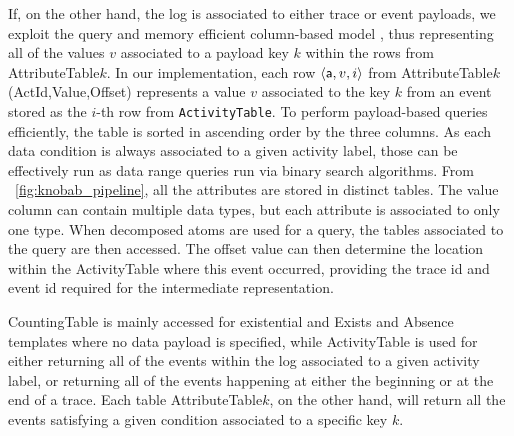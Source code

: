 If, on the other hand, the log is associated to either trace or event payloads, we exploit 
the query and memory efficient  column-based model \cite{IdreosGNMMK12}, thus representing all of the values $v$ associated to a  payload key $k$ within the rows from  \textsf{AttributeTable$k$}. In our implementation, each row $\braket{\textsf{a},v,i}$ from  \textsf{AttributeTable$k$(ActId,Value,Offset)} represents a value $v$ associated to the key $k$ from an event stored as the $i$-th row from \texttt{ActivityTable}. To perform payload-based queries efficiently, the table is sorted in ascending order by the  three columns. As each data condition is always associated to a given activity label, those can be effectively run as data range queries run via binary search algorithms. From \figurename~\ref{fig:knobab_pipeline}, all the attributes are stored in distinct tables. The value column can contain multiple data types, but each attribute is associated to only one type. When decomposed atoms are used for a query, the tables associated to the query are then accessed. The offset value can then determine the location within the \textsf{ActivityTable} where this event occurred, providing the trace id and event id required for the intermediate representation.

\textsf{CountingTable} is mainly accessed for existential and \textsf{Exists} and \textsf{Absence} templates where no data payload is specified, while  \textsf{ActivityTable} is  used for either returning all of the events within the log associated to a given activity label, or returning all of the events happening at either the beginning or at the end of a trace. Each table \textsf{AttributeTable$k$}, on the other hand, will %
return all the events satisfying a given condition associated to a specific %
key $k$. %

